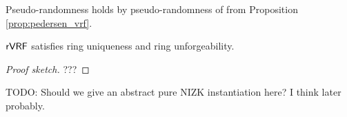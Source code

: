 Pseudo-randomness holds by pseudo-randomness of \PedVRF from
Proposition \ref{prop:pedersen_vrf}.

\begin{proposition}\label{prop:pedersen_rvrf}
	${\mathsf{rVRF}}$ satisfies ring uniqueness and ring unforgeability.
\end{proposition}

\begin{proof}[Proof sketch]
	???
\end{proof}


TODO:  Should we give an abstract pure NIZK instantiation here?  I think later probably.




